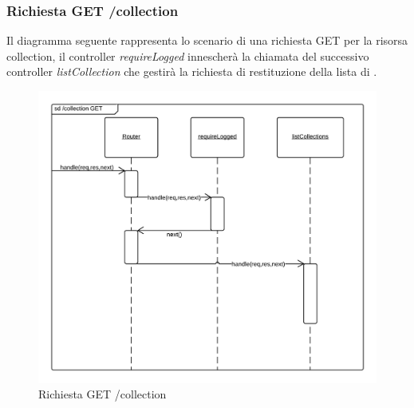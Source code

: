 \subsubsection{Richiesta GET /collection} 
Il diagramma seguente rappresenta lo scenario di una richiesta GET per la risorsa collection, il controller \emph{requireLogged} innescherà la chiamata del successivo controller \emph{listCollection} che gestirà la richiesta di restituzione della lista di .
\begin{figure}[H]
	\begin{center} 
		\includegraphics[scale=0.20]{scenari/Collection GET.png} 
		\caption{Richiesta GET /collection}
	\end{center} 
\end{figure}

\pagebreak
